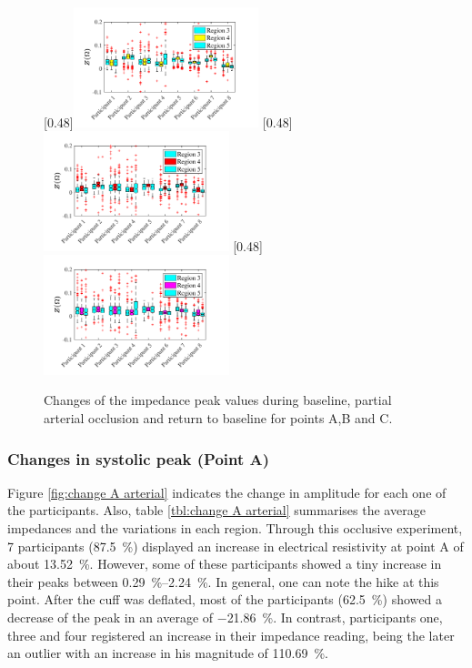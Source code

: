 \begin{figure}
	\null\hfill%
	[0.48\textwidth]{\includegraphics[width=0.48\textwidth, trim={0.5cm 0cm 1.5cm 0 cm}, clip]{figure_apa_5a}}%
	\hfill%
	[0.48\textwidth]{\includegraphics[width=0.48\textwidth, trim={0.5cm 0cm 1.5cm 0 cm}, clip]{figure_apa_5b}}%
	\hfill%
	[0.48\textwidth]{\includegraphics[width=0.48\textwidth, trim={0.5cm 0cm 1.5cm 0 cm}, clip]{figure_apa_5c}}%
	\null%
	\caption{Changes of the impedance peak values during baseline, partial arterial occlusion and return to baseline for points A,B and C.}
	\label{fig:iPG change points arterial}
\end{figure}

\subsubsection{Changes in systolic peak (Point A)}
\label{section apa 3.2.1}
Figure \ref{fig:change A arterial} indicates the change in amplitude for each one of the participants. Also, table \ref{tbl:change A arterial} summarises the average impedances and the variations in each region. Through this occlusive experiment, 7 participants (\SI{87.5}{\percent}) displayed an increase in electrical resistivity at point A of about \SI{13.52}{\percent}. However, some of these participants showed a tiny increase in their peaks between \SIrange{0.29}{2.24}{\percent}. In general, one can note the hike at this point. After the cuff was deflated, most of the participants (\SI{62.5}{\percent}) showed a decrease of the peak in an average of \SI{-21.86}{\percent}.  In contrast, participants one, three and four registered an increase in their impedance reading, being the later an outlier with an increase in his magnitude of \SI{110.69}{\percent}.

